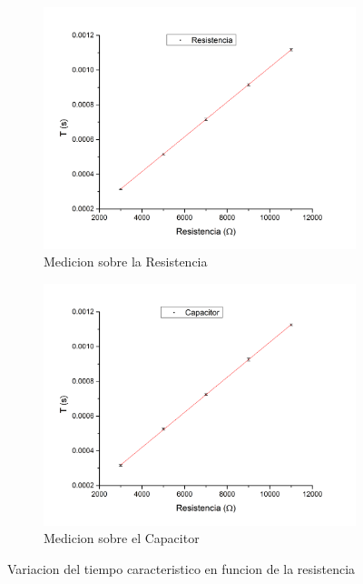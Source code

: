 \documentclass[11pt,a4paper]{article}
\begin{document}
\begin{figure}[H]

\begin{subfigure}{0.5\textwidth}
\includegraphics[scale=0.30]{Tau-RCvsR_Resistencia}
  \caption{Medicion sobre la Resistencia}
  \label{subfig:RCvsRR}
\end{subfigure}
\begin{subfigure}{0.5\textwidth}
\includegraphics[scale=0.30]{Tau-RCvsR_Capacitor}
  \caption{Medicion sobre el Capacitor}
  \label{subfig:RCvsRC}
\end{subfigure}
  \caption{Variacion del tiempo caracteristico en funcion de la resistencia}
  \label{fig:RCvsR}
\end{figure}
\end{document}
